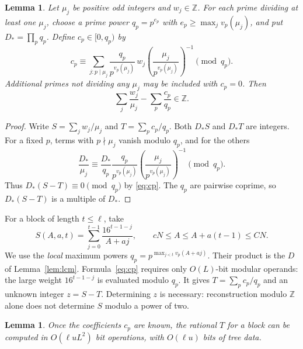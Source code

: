 \documentclass[11pt]{article}
\numberwithin{equation}{section}
\newtheorem{lemma}[theorem]{Lemma}
\theoremstyle{definition}
\newcommand{\Z}{\mathbb Z}
\begin{document}
\begin{lemma}\label{lem:crt}
Let $\mu_j$ be positive odd integers and $w_j\in\Z$.
For each prime dividing at least one $\mu_j$, choose a prime power
$q_p=p^{e_p}$ with $e_p\ge\max_j v_p(\mu_j)$, and put
$D_*=\prod_p q_p$. Define $c_p\in[0,q_p)$ by
\begin{equation}\label{eq:cp}
 c_p\equiv
 \sum_{j:p\mid\mu_j}
 \frac{q_p}{p^{v_p(\mu_j)}}\,w_j
 \left(\frac{\mu_j}{p^{v_p(\mu_j)}}\right)^{-1}
 \pmod{q_p}.
\end{equation}
Additional primes not dividing any $\mu_j$ may be included with
$c_p=0$. Then
\begin{equation}\label{eq:integer-correction}
 \sum_j\frac{w_j}{\mu_j}
 -\sum_p\frac{c_p}{q_p}\in\Z.
\end{equation}
\end{lemma}

\begin{proof}
Write $S=\sum_jw_j/\mu_j$ and $T=\sum_pc_p/q_p$.
Both $D_*S$ and $D_*T$ are integers. For a fixed $p$,
terms with $p\nmid\mu_j$ vanish modulo $q_p$, and for the others
\[
 \frac{D_*}{\mu_j}\equiv
 \frac{D_*}{q_p}\frac{q_p}{p^{v_p(\mu_j)}}
 \left(\frac{\mu_j}{p^{v_p(\mu_j)}}\right)^{-1}
 \pmod{q_p}.
\]
Thus $D_*(S-T)\equiv0\pmod{q_p}$ by \eqref{eq:cp}.
The $q_p$ are pairwise coprime, so $D_*(S-T)$ is a
multiple of $D_*$.
\end{proof}

For a block of length $t\le\ell$, take
\begin{equation}\label{eq:block}
 S(A,a,t)=\sum_{j=0}^{t-1}\frac{16^{t-1-j}}{A+aj},
 \qquad cN\le A\le A+a(t-1)\le CN.
\end{equation}
We use the \emph{local} maximum powers
$q_p=p^{\max_{j<t}v_p(A+aj)}$. Their product is the $D$
of Lemma~\ref{lem:lcm}. Formula~\eqref{eq:cp} requires only
$O(L)$-bit modular operands: the large weight $16^{t-1-j}$
is evaluated modulo $q_p$.
It gives $T=\sum_pc_p/q_p$ and an unknown integer $z=S-T$.
Determining $z$ is necessary: reconstruction modulo $\Z$ alone
does not determine $S$ modulo a power of two.

\begin{lemma}\label{lem:prime-tree}
Once the coefficients $c_p$ are known, the rational $T$ for a
block can be computed in $O(\ell uL^2)$ bit operations, with
$O(\ell u)$ bits of tree data.
\end{lemma}
\end{document}
